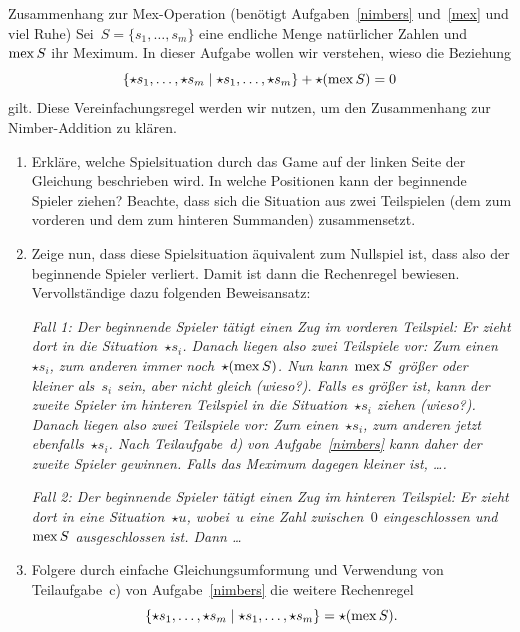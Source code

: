 \documentclass{zirkelblatt}
\begin{document}
\begin{aufgabe}{Zusammenhang zur Mex-Operation (benötigt Aufgaben~\ref{nimbers}
und~\ref{mex} und viel Ruhe)}
\label{zusammenhang-mex}
Sei~$S = \{ s_1,\ldots,s_m \}$ eine endliche Menge natürlicher Zahlen und~$\operatorname{mex}
S$ ihr Meximum. In dieser Aufgabe wollen wir verstehen, wieso die Beziehung
\[ \{ \star s_1,\ldots,\star s_m \mathrel{|} \star s_1,\ldots,\star s_m \} + \star(\operatorname{mex} S)
= 0
\]
gilt. Diese Vereinfachungsregel werden wir nutzen, um den Zusammenhang zur
Nimber-Addition zu klären.
\begin{enumerate}
\item Erkläre, welche Spielsituation durch das Game auf der linken Seite der
Gleichung beschrieben wird. In welche Positionen kann der beginnende Spieler
ziehen? Beachte, dass sich die Situation aus zwei Teilspielen (dem zum vorderen
und dem zum hinteren Summanden) zusammensetzt.
\item Zeige nun, dass diese Spielsituation äquivalent zum Nullspiel ist, dass
also der beginnende Spieler verliert. Damit ist dann die Rechenregel bewiesen.
Vervollständige dazu folgenden Beweisansatz:

\emph{Fall 1: Der beginnende Spieler tätigt einen Zug im vorderen Teilspiel: Er
zieht dort in die Situation~$\star s_i$. Danach liegen also zwei Teilspiele
vor: Zum einen~$\star s_i$, zum anderen immer noch~$\star(\operatorname{mex} S)$. Nun
kann~$\operatorname{mex} S$ größer oder kleiner als~$s_i$ sein, aber nicht gleich (wieso?).
Falls es größer ist, kann der zweite Spieler im hinteren Teilspiel in die
Situation~$\star s_i$ ziehen (wieso?). Danach liegen also zwei Teilspiele vor:
Zum einen~$\star s_i$, zum anderen jetzt ebenfalls~$\star s_i$. Nach
Teilaufgabe~d) von Aufgabe~\ref{nimbers} kann daher der zweite Spieler
gewinnen. Falls das Meximum dagegen kleiner ist, \ldots.}

\emph{Fall 2: Der beginnende Spieler tätigt einen Zug im hinteren Teilspiel:
Er zieht dort in eine Situation~$\star u$, wobei~$u$ eine Zahl zwischen~$0$
eingeschlossen und~$\operatorname{mex} S$ ausgeschlossen ist. Dann \ldots}
\item Folgere durch einfache Gleichungsumformung und Verwendung von
Teilaufgabe~c) von Aufgabe~\ref{nimbers} die weitere Rechenregel
\[ \{ \star s_1,\ldots,\star s_m \mathrel{|} \star s_1,\ldots,\star s_m \} = \star(\operatorname{mex}
S). \]
\end{enumerate}
\end{aufgabe}
\end{document}
